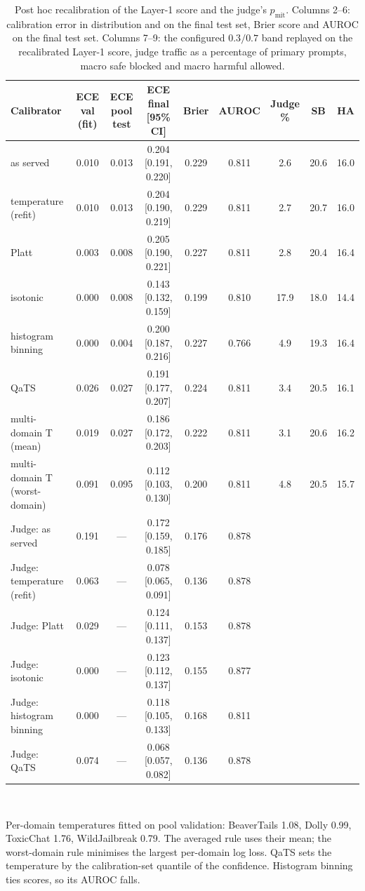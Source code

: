 \documentclass[journal]{IEEEtran}
\begin{document}
\setcounter{table}{10}
\begin{table}[!htbp]
\caption{Post hoc recalibration of the Layer-1 score and the judge's $p_{\mathrm{mit}}$. Columns 2--6: calibration error in distribution and on the final test set, Brier score and AUROC on the final test set. Columns 7--9: the configured $0.3/0.7$ band replayed on the recalibrated Layer-1 score, judge traffic as a percentage of primary prompts, macro safe blocked and macro harmful allowed.}
\label{abr:tab:calibalt}
\centering
\scriptsize
\setlength{\tabcolsep}{3pt}
\begin{tabular}{@{}lccccc ccc@{}}
\toprule
Calibrator & ECE val (fit) & ECE pool test & ECE final [95\% CI] & Brier & AUROC & Judge \% & SB & HA \\
\midrule
as served & 0.010 & 0.013 & 0.204 [0.191, 0.220] & 0.229 & 0.811 & 2.6 & 20.6 & 16.0 \\
temperature (refit) & 0.010 & 0.013 & 0.204 [0.190, 0.219] & 0.229 & 0.811 & 2.7 & 20.7 & 16.0 \\
Platt & 0.003 & 0.008 & 0.205 [0.190, 0.221] & 0.227 & 0.811 & 2.8 & 20.4 & 16.4 \\
isotonic & 0.000 & 0.008 & 0.143 [0.132, 0.159] & 0.199 & 0.810 & 17.9 & 18.0 & 14.4 \\
histogram binning & 0.000 & 0.004 & 0.200 [0.187, 0.216] & 0.227 & 0.766 & 4.9 & 19.3 & 16.4 \\
QaTS & 0.026 & 0.027 & 0.191 [0.177, 0.207] & 0.224 & 0.811 & 3.4 & 20.5 & 16.1 \\
multi-domain T (mean) & 0.019 & 0.027 & 0.186 [0.172, 0.203] & 0.222 & 0.811 & 3.1 & 20.6 & 16.2 \\
multi-domain T (worst-domain) & 0.091 & 0.095 & 0.112 [0.103, 0.130] & 0.200 & 0.811 & 4.8 & 20.5 & 15.7 \\
\midrule
Judge: as served & 0.191 & --- & 0.172 [0.159, 0.185] & 0.176 & 0.878 & & &  \\
Judge: temperature (refit) & 0.063 & --- & 0.078 [0.065, 0.091] & 0.136 & 0.878 & & &  \\
Judge: Platt & 0.029 & --- & 0.124 [0.111, 0.137] & 0.153 & 0.878 & & &  \\
Judge: isotonic & 0.000 & --- & 0.123 [0.112, 0.137] & 0.155 & 0.877 & & &  \\
Judge: histogram binning & 0.000 & --- & 0.118 [0.105, 0.133] & 0.168 & 0.811 & & &  \\
Judge: QaTS & 0.074 & --- & 0.068 [0.057, 0.082] & 0.136 & 0.878 & & &  \\
\bottomrule
\end{tabular}
\\[2pt]
\parbox{\linewidth}{\scriptsize Per-domain temperatures fitted on pool validation: BeaverTails 1.08, Dolly 0.99, ToxicChat 1.76, WildJailbreak 0.79. The averaged rule uses their mean; the worst-domain rule minimises the largest per-domain log loss. QaTS sets the temperature by the calibration-set quantile of the confidence. Histogram binning ties scores, so its AUROC falls.}
\end{table}
\end{document}

